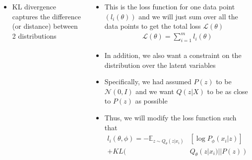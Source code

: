 \begin{frame}
\begin{columns}
	\begin{overlayarea}{\textwidth}{\textheight}
	   
		\vspace{-0.7cm}
		\begin{itemize}\justifying
			\item<5-> KL divergence captures the difference (or distance) between 2 distributions
		\end{itemize}
	\end{overlayarea}
	\begin{overlayarea}{\textwidth}{\textheight}
		\begin{itemize}\justifying
			\item<1-> This is the loss function for one data point $(l_i(\theta))$ and we will just sum over all the data points to get the total loss $\mathscr{L(\theta)}$
			\vspace{-0.8em}
			\begin{align*}
				\mathscr{L(\theta)}=\sum_{i=1}^ml_i(\theta)
			\end{align*}
			\vspace{-0.9em}
			\item<2-> In addition, we also want a constraint on the distribution over the latent variables 
			\item<3-> Specifically, we had assumed $P(z)$ to be $\mathcal{N}(0, I)$ and we want $Q(z|X)$ to be as close to $P(z)$ as possible
			\item<4-> Thus, we will modify the loss function such that 
			\begin{align*}
				l_i(\theta,\phi)=-\mathbb{E}_{z \sim Q_{\theta}(z|x_i)}& [\log P_{\phi}(x_i|z)] \\
				+ KL(&Q_{\theta}(z|x_i)||P(z))
			\end{align*}
		\end{itemize}
	\end{overlayarea}
\end{columns}
\end{frame}

